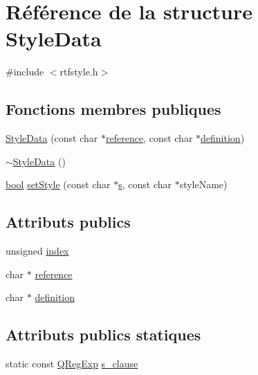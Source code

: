 \hypertarget{struct_style_data}{}\section{Référence de la structure Style\+Data}
\label{struct_style_data}


{\ttfamily \#include $<$rtfstyle.\+h$>$}

\subsection*{Fonctions membres publiques}
\begin{DoxyCompactItemize}
\item 
\hyperlink{struct_style_data_a3b478669fea15283276db4a036582c12}{Style\+Data} (const char $\ast$\hyperlink{struct_style_data_aa83b48b8d838f93571decb3160be8c0a}{reference}, const char $\ast$\hyperlink{struct_style_data_a604f4e5cb27a87ada3ca30bd4b196650}{definition})
\item 
\hyperlink{struct_style_data_a57d64f785c030904d672d5f9d81a1c43}{$\sim$\+Style\+Data} ()
\item 
\hyperlink{qglobal_8h_a1062901a7428fdd9c7f180f5e01ea056}{bool} \hyperlink{struct_style_data_ae62e4fcfe258807c0dcdffcaf82500f8}{set\+Style} (const char $\ast$\hyperlink{060__command__switch_8tcl_a011c73f2dbb87635a3b4206c72355f6e}{s}, const char $\ast$style\+Name)
\end{DoxyCompactItemize}
\subsection*{Attributs publics}
\begin{DoxyCompactItemize}
\item 
unsigned \hyperlink{struct_style_data_ac74fb0d3bea6b08d24488c66dabae064}{index}
\item 
char $\ast$ \hyperlink{struct_style_data_aa83b48b8d838f93571decb3160be8c0a}{reference}
\item 
char $\ast$ \hyperlink{struct_style_data_a604f4e5cb27a87ada3ca30bd4b196650}{definition}
\end{DoxyCompactItemize}
\subsection*{Attributs publics statiques}
\begin{DoxyCompactItemize}
\item 
static const \hyperlink{class_q_reg_exp}{Q\+Reg\+Exp} \hyperlink{struct_style_data_a33092391b83203d69fc4532b460cec39}{s\+\_\+clause}
\end{DoxyCompactItemize}


